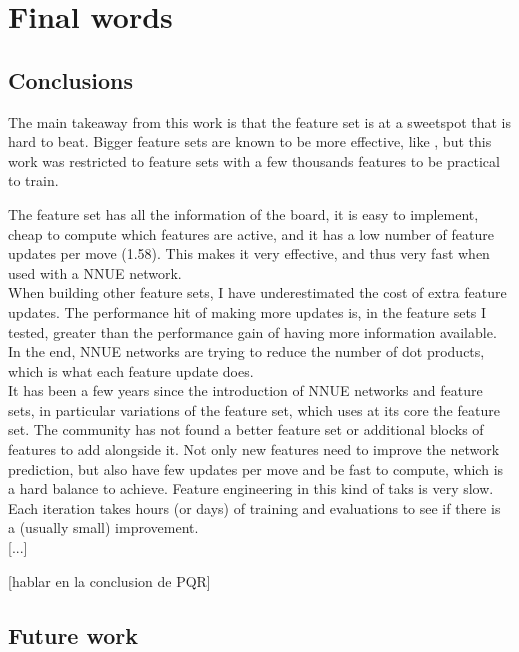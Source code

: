 \section{Final words}
\subsection{Conclusions}


The main takeaway from this work is that the  feature set is at a sweetspot that is hard to beat. Bigger feature sets are known to be more effective, like , but this work was restricted to feature sets with a few thousands features to be practical to train.

The feature set  has all the information of the board, it is easy to implement, cheap to compute which features are active, and it has a low number of feature updates per move (1.58). This makes it very effective, and thus very fast when used with a NNUE network. \\

When building other feature sets, I have underestimated the cost of extra feature updates. The performance hit of making more updates is, in the feature sets I tested, greater than the performance gain of having more information available. In the end, NNUE networks are trying to reduce the number of dot products, which is what each feature update does. \\

It has been a few years since the introduction of NNUE networks and feature sets, in particular variations of the  feature set, which uses at its core the  feature set. 
The community has not found a better feature set or additional blocks of features to add alongside it. Not only new features need to improve the network prediction, but also have few updates per move and be fast to compute, which is a hard balance to achieve.
Feature engineering in this kind of taks is very slow. Each iteration takes hours (or days) of training and evaluations to see if there is a (usually small) improvement. \\

[...]

[hablar en la conclusion de PQR]

\subsection{Future work}

